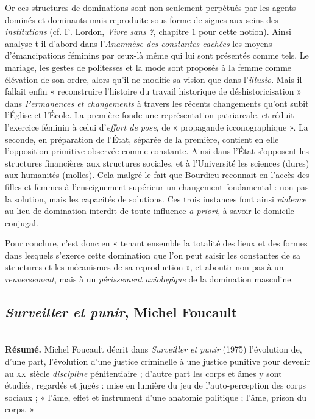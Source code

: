 \documentclass[11pt]{amsart}
\begin{document}
Or ces structures de dominations sont non seulement perpétués par les agents dominés et dominants mais reproduite sous forme de signes aux seins des \emph{institutions} (cf. F. Lordon, \textsl{Vivre sans ?}, chapitre $1$ pour cette notion). Ainsi analyse-t-il d'abord dans l'\textsl{Anamnèse des constantes cachées} les moyens d'émancipations féminins par ceux-là même qui lui sont présentés comme tels. Le mariage, les gestes de politesses et la mode sont proposés à la femme comme élévation de son ordre, alors qu'il ne modifie sa vision que dans l'\textit{illusio}. Mais il fallait enfin « reconstruire l'histoire du travail historique de déshistoricisation » dans \textsl{Permanences et changements} à travers les récents changements qu'ont subit l'\'Eglise et l'\'Ecole. La première fonde une représentation patriarcale, et réduit l'exercice féminin à celui d'\textit{effort de pose}, de « propagande icconographique ». La seconde, en préparation de l'\'Etat, séparée de la première, contient en elle l'opposition primitive observée comme constante. Ainsi dans l'\'Etat s'opposent les structures financières aux structures sociales, et à l'Université les sciences (dures) aux humanités (molles). Cela malgré le fait que Bourdieu reconnait en l'accès des filles et femmes à l'enseignement supérieur un changement fondamental : non pas la solution, mais les capacités de solutions. Ces trois instances font ainsi \textit{violence} au lieu de domination interdit de toute influence \textit{a priori}, à savoir le domicile conjugal. 

Pour conclure, c'est donc en « tenant ensemble la totalité des lieux et des formes dans lesquels s'exerce cette domination que l'on peut saisir les constantes de sa structures et les mécanismes de sa reproduction », et aboutir non pas à un \textit{renversement}, mais à un \textit{périssement axiologique} de la domination masculine.
\newpage

\subsection*{\textsl{Surveiller et punir}, Michel Foucault}$ $\\

\textbf{Résumé.} Michel Foucault décrit dans \textsl{Surveiller et punir} (1975) l'évolution de, d'une part, l'évolution d'une justice criminelle à une justice punitive pour devenir au \textsc{xx}\ieme \ siècle \textit{discipline} pénitentiaire ; d'autre part les corps et âmes y sont étudiés, regardés et jugés : mise en lumière du jeu de l'auto-perception des corps sociaux ; « l'âme, effet et instrument d'une anatomie politique ; l'âme, prison du corps. »\\
\end{document}

